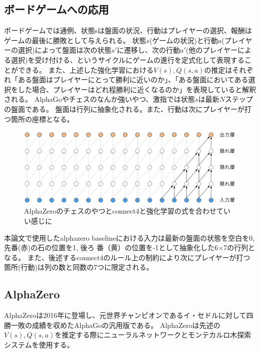 \subsection{ボードゲームへの応用}
ボードゲームでは通例、状態sは盤面の状況、行動はプレイヤーの選択、報酬はゲームの最後に勝敗として与えられる。
状態$s$(ゲームの状況)と行動$a$(プレイヤーの選択)によって盤面は次の状態$s'$に遷移し、次の行動$a'$(他のプレイヤーによる選択)を受け付ける、というサイクルにゲームの進行を定式化して表現することができる。
また、上述した強化学習における$V(s),Q(s, a)$の推定はそれぞれ「ある盤面はプレイヤーにとって勝利に近いのか」、「ある盤面においてある選択をした場合、プレイヤーはどれ程勝利に近くなるのか」を表現していると解釈される。
AlphaGo\cite{oord2016wavenet}やチェスのなんか強いやつ\cite{oord2016wavenet}、激指\cite{oord2016wavenet}では状態$s$は最新$N$ステップの盤面である。
盤面は行列に抽象化される。また、行動は次にプレイヤーが打つ箇所の座標となる。
\begin{figure}[t]
	\centering
	\includegraphics[width=\linewidth]{./figure/ccl.png}
	\caption{AlphaZeroのチェスのやつとconnect4と強化学習の式を合わせていい感じに}
	\label{fig:ccl}
\end{figure}
本論文で使用したalphazero baselineにおける入力は最新の盤面の状態を空白を0, 先番(赤)の石の位置を1, 後ろ
番（黄）の位置を-1として抽象化した6$\times$7の行列となる。
また、後述するconnect4のルール上の制約により次にプレイヤーが打つ箇所(行動)は列の数と同数の7つに限定される。

\subsection{AlphaZero}
AlphaZeroは2016年に登場し、元世界チャンピオンであるイ・セドルに対して四勝一敗の成績を収めたAlphaGoの汎用版である。
AlphaZeroは先述の$V(s),Q(s, a)$を推定する際にニューラルネットワークとモンテカルロ木探索システムを使用する。
